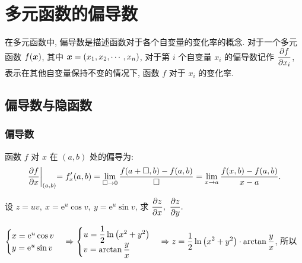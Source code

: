 \section{多元函数的偏导数}

在多元函数中, 偏导数是描述函数对于各个自变量的变化率的概念.
对于一个多元函数 $f(\vb*{x})$, 其中 $\vb*{x}=(x_1,x_2,\cdots,x_n)$, 对于第 $i$ 个自变量 $x_i$ 的偏导数记作 $\displaystyle\pdv{f}{x_i}$, 
表示在其他自变量保持不变的情况下, 函数 $f$ 对于 $x_i$ 的变化率.

\subsection{偏导数与隐函数}

\subsubsection{偏导数}

\begin{definition}[偏导数]
    函数 $f$ 对 $x$ 在 $(a,b)$ 处的偏导为:
    $$\displaystyle \pdv{f}{x}\biggl |_{(a,b)}=f'_x(a,b)=\lim_{\Box\to0}\dfrac{f(a+\Box,b)-f(a,b)}{\Box}=\lim_{x\to a}\dfrac{f(x,b)-f(a,b)}{x-a}.$$
\end{definition}

\begin{example}
    设 $z=uv,~x=\mathrm{e}^u\cos v,~y=\mathrm{e}^u\sin v$, 求 $\displaystyle \pdv{z}{x},~\pdv{z}{y}.$
\end{example}
\begin{solution}
    $\displaystyle\begin{cases}
            x=\mathrm{e}^u\cos v \\
            y=\mathrm{e}^u\sin v
        \end{cases}\Rightarrow
        \begin{cases}
            u=\dfrac{1}{2}\ln\qty(x^2+y^2) \\
            v=\arctan \dfrac{y}{x}
        \end{cases}\Rightarrow z=\dfrac{1}{2}\ln\qty(x^2+y^2)\cdot\arctan\dfrac{y}{x}$, 所以
\end{solution}

